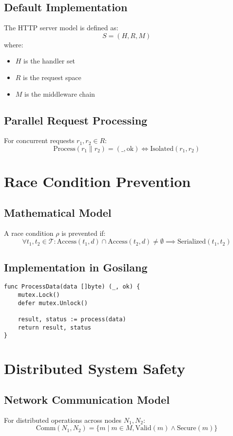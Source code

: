 \documentclass{article}
\begin{document}
\subsection{Default Implementation}
The HTTP server model is defined as:
\[
S = (H, R, M)
\]
where:
\begin{itemize}
    \item $H$ is the handler set
    \item $R$ is the request space
    \item $M$ is the middleware chain
\end{itemize}

\subsection{Parallel Request Processing}
For concurrent requests $r_1, r_2 \in R$:
\[
\text{Process}(r_1 \parallel r_2) = (\_,\text{ok}) \iff \text{Isolated}(r_1, r_2)
\]

\section{Race Condition Prevention}
\subsection{Mathematical Model}
A race condition $\rho$ is prevented if:
\[
\forall t_1, t_2 \in \mathcal{T}: \text{Access}(t_1, d) \cap \text{Access}(t_2, d) \neq \emptyset \implies \text{Serialized}(t_1, t_2)
\]

\subsection{Implementation in Gosilang}
\begin{tcolorbox}[title=Thread-Safe Data Access Pattern]
\begin{verbatim}
func ProcessData(data []byte) (_, ok) {
    mutex.Lock()
    defer mutex.Unlock()
    
    result, status := process(data)
    return result, status
}
\end{verbatim}
\end{tcolorbox}

\section{Distributed System Safety}
\subsection{Network Communication Model}
For distributed operations across nodes $N_1, N_2$:
\[
\text{Comm}(N_1, N_2) = \{m \mid m \in M, \text{Valid}(m) \land \text{Secure}(m)\}
\]
\end{document}
